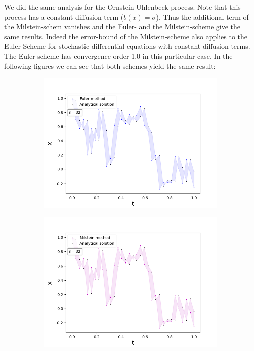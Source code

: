 We did the same analysis for the Ornstein-Uhlenbeck process. Note that this process has a constant diffusion term (\(b(x)=\sigma\)). Thus the additional term of the Milstein-schem vanishes and the Euler- and the Milstein-scheme give the same results. Indeed the error-bound of the Milstein-scheme also applies to the Euler-Scheme for stochastic differential equations with constant diffusion terms. The Euler-scheme has convergence order 1.0 in this particular case.
In the following figures we can see that both schemes yield the same result:
\vfill
\begin{figure}[!h]
\centering
   \begin{subfigure}{0.49\linewidth} \centering
     \includegraphics[scale=0.4]{Content/Graphics/SDE_EulerOU_n_32}
   \end{subfigure}
   \begin{subfigure}{0.49\linewidth} \centering
     \includegraphics[scale=0.4]{Content/Graphics/SDE_MilsteinOU_n_32}

\end{subfigure}
\end{figure}
